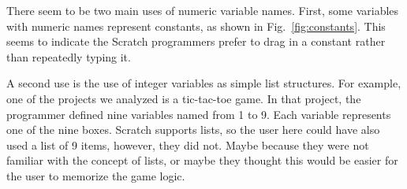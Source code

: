 \documentclass[conference]{IEEEtran}
\begin{document}
There seem to be two main uses of numeric variable names. First, some variables with numeric names represent constants, as shown in Fig.~\ref{fig:constants}. This seems to indicate the Scratch programmers prefer to drag in a constant rather than repeatedly typing it.

A second use is the use of integer variables as simple list structures. For example, one of the projects we analyzed is a tic-tac-toe game. In that project, the programmer defined nine variables named from 1 to 9. Each variable represents one of the nine boxes. Scratch supports lists, so the user here could have also used a list of 9 items, however, they did not. Maybe because they were not familiar with the concept of lists, or maybe they thought this would be easier for the user to memorize the game logic.  
\end{document}
